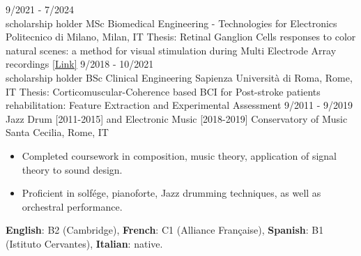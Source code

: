 \documentclass[9pt]{developercv} %
\begin{document}
\vspace{-18 pt}
\begin{entrylist}
    \entry
		{9/2021 - 7/2024 \\\footnotesize{scholarship holder}}
		{MSc Biomedical Engineering - Technologies for Electronics }
		{Politecnico di Milano, Milan, IT}
		{Thesis: Retinal Ganglion Cells responses to color natural scenes: a method for visual stimulation during Multi Electrode Array recordings \textcolor{blue}{\href{https://hdl.handle.net/10589/222510}{[Link]}}}
    \entry
		{9/2018 - 10/2021 \\\footnotesize{scholarship holder}}
		{BSc Clinical Engineering}
		{Sapienza Università di Roma, Rome, IT}
		{Thesis: Corticomuscular-Coherence based BCI for Post-stroke patients rehabilitation: Feature Extraction and Experimental Assessment}
	\entry
		{9/2011 - 9/2019}
		{Jazz Drum [2011-2015] and Electronic Music [2018-2019]}
		{Conservatory of Music Santa Cecilia, Rome, IT}
		{ \begin{itemize}[noitemsep,topsep=0pt,parsep=0pt,partopsep=0pt, leftmargin= 10pt]
            \item Completed coursework in composition, music theory, application of signal theory to sound design. 
            \item Proficient in solfége, pianoforte, Jazz drumming techniques, as well as orchestral performance.
            \end{itemize}
        }
\end{entrylist}

\vspace{-20 pt}
    \vspace{-10pt}
    
    \hspace{26mm} \textbf{English}: B2 (Cambridge), \textbf{French}: C1 (Alliance Française), \textbf{Spanish}: B1 (Istituto Cervantes), \textbf{ Italian}: native.

\end{document}
